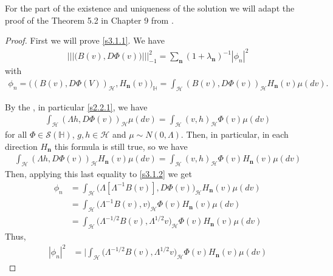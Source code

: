 \documentclass[review, onefignum, onetabnum]{siamart171218}
\begin{document}
    For the part of the existence and uniqueness of the solution we will adapt
    the proof of the Theorem 5.2 in Chapter 9 from \cite{liu}.
\begin{proof}
    First we will prove \eqref{s3.1.1}. We have
    \begin{align*}
        ||| \big(B(v),D\Phi(v) \big) |||_{-1}^2 =\sum_{\mathbf{n}}
        (1+\lambda_{\mathbf{n}})^{-1}|\phi_n|^2
    \end{align*}
    with
    \begin{align}
        \phi_n=
        \Big(
            (B(v),D\Phi(V))_{\mathcal{H}}, H_{\mathbf{n}}(v)
        \Big)_{\mathbb{H}}
        =\int_{\mathcal{H}} (B(v),D\Phi(v))_{\mathcal{H}} H_{\mathbf{n}}(v)
        \mu(dv).\label{s3.1.2}
\end{align}

By the , in particular \eqref{s2.2.1}, we have
\begin{align*}
 \int_{\mathcal{H}} (\Lambda h,D\Phi(v))_{\mathcal{H}}  \mu(dv) =
\int_{\mathcal{H}} (v,h)_{\mathcal{H}} \Phi(v)  \mu(dv)
\end{align*}
for all $\Phi\in \mathcal{S}(\mathbb{H})$, $g,h\in \mathcal{H}$ and $\mu\sim
N(0,\Lambda)$. Then, in particular, in each direction $H_{\mathbf{n}}$
this formula is still true, so we have
\begin{align*}
 \int_{\mathcal{H}} (\Lambda h,D\Phi(v))_{\mathcal{H}} H_{\mathbf{n}}(v)
\mu(dv) =
 \int_{\mathcal{H}} (v,h)_{\mathcal{H}} \Phi(v) H_{\mathbf{n}}(v) \mu(dv)
\end{align*}
Then, applying this last equality to \eqref{s3.1.2} we get
\begin{align}
 \phi_n &=\int_{\mathcal{H}}
\big(\Lambda[\Lambda^{-1}B(v)],D\Phi(v)\big)_{\mathcal{H}} H_{\mathbf{n}}(v)
\mu(dv)\nonumber\\
 &= \int_{\mathcal{H}} \big(\Lambda^{-1}B(v),v \big)_{\mathcal{H}} \Phi(v)
H_{\mathbf{n}}(v) \mu(dv)\nonumber\\
 &= \int_{\mathcal{H}} \big(\Lambda^{-1/2}B(v),\Lambda^{1/2}v
\big)_{\mathcal{H}} \Phi(v) H_{\mathbf{n}}(v) \mu(dv)\nonumber
 \end{align}
Thus,
\begin{equation}
    \label{s3.1.3}
    \begin{aligned}
        |\phi_n |^2 &=
            \Bigg|
                \int_{\mathcal{H}}
                    \big(
                        \Lambda^{-1/2}B(v),\Lambda^{1/2}v
                    \big)_{\mathcal{H}} \Phi(v)
                    H_{\mathbf{n}}(v) \mu(dv)

\end{aligned}
\end{equation}
\end{proof}
\end{document}
